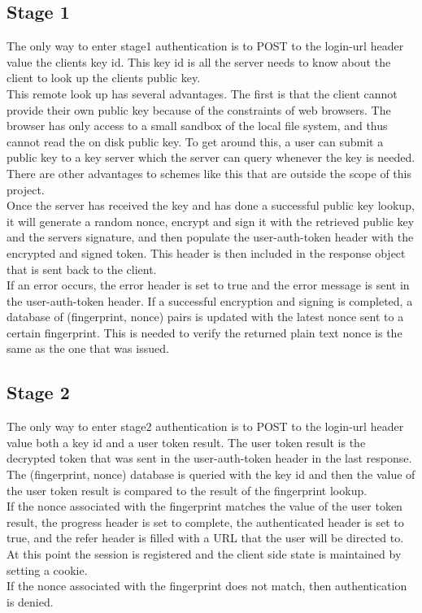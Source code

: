 \documentclass[11pt]{article}
\begin{document}
\subsection{Stage 1} \label{subsec:stage1}
The only way to enter stage1 authentication is to POST to the login-url header value the clients key id. This key id is all the server needs to know about the client to look up the clients public key. \\
This remote look up has several advantages. The first is that the client cannot provide their own public key because of the constraints of web browsers. The browser has only access to a small sandbox of the local file system, and thus cannot read the on disk public key. To get around this, a user can submit a public key to a key server which the server can query whenever the key is needed. There are other advantages to schemes like this that are outside the scope of this project. \\
Once the server has received the key and has done a successful public key lookup, it will generate a random nonce, encrypt and sign it with the retrieved public key and the servers signature, and then populate the user-auth-token header with the encrypted and signed token. This header is then included in the response object that is sent back to the client. \\
If an error occurs, the error header is set to true and the error message is sent in the user-auth-token header. If a successful encryption and signing is completed, a database of (fingerprint, nonce) pairs is updated with the latest nonce sent to a certain fingerprint. This is needed to verify the returned plain text nonce is the same as the one that was issued.

\subsection{Stage 2} \label{subsec:stage2}
The only way to enter stage2 authentication is to POST to the login-url header value both a key id and a user token result. The user token result is the decrypted token that was sent in the user-auth-token header in the last response. \\
The (fingerprint, nonce) database is queried with the key id and then the value of the user token result is compared to the result of the fingerprint lookup. \\
If the nonce associated with the fingerprint matches the value of the user token result, the progress header is set to complete, the authenticated header is set to true, and the refer header is filled with a URL that the user will be directed to. At this point the session is registered and the client side state is maintained by setting a cookie. \\
If the nonce associated with the fingerprint does not match, then authentication is denied.
\end{document}
